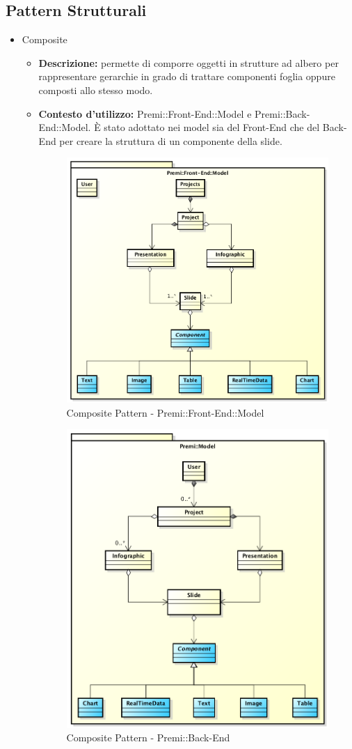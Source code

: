 \subsection{Pattern Strutturali}
\begin{itemize}
	\item Composite
	\begin{itemize}
		\item \textbf{Descrizione:} permette di comporre oggetti in strutture ad albero per rappresentare gerarchie in grado di trattare componenti foglia oppure composti allo stesso modo.
		\item \textbf{Contesto d'utilizzo:} Premi::Front-End::Model e Premi::Back-End::Model. È stato adottato nei model sia del \gls{Front-End} che del \gls{Back-End} per creare la struttura di un componente della slide. 
		\begin{figure}[h]
			\centering
			\includegraphics[width=0.5\linewidth]{img/front-end_model_composite}
			\caption[Composite Pattern - Premi::Front-End::Model]{Composite Pattern - Premi::Front-End::Model}
		\end{figure}
		\begin{figure}[h]
			\centering
			\includegraphics[width=0.5\linewidth]{img/back-end_logic-tier_premi_model_composite}
			\caption[Composite Pattern - Premi::Back-End]{Composite Pattern - Premi::Back-End}
		\end{figure}
	\end{itemize}

\end{itemize}

